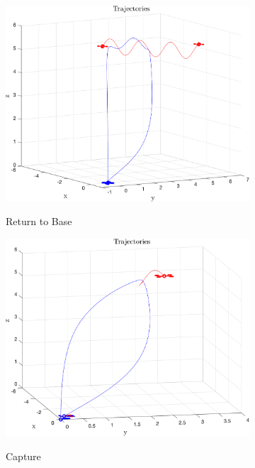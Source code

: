 \documentclass{article}
\begin{document}
\begin{multicols}{2}
\begin{figure}[H]
\begin{subfigure}[b]{0.45\columnwidth}
    \includegraphics[width = 1\textwidth]{images/ReturnToBase.png}
     \label{fig:Return}
     \vspace{-5mm}
      \caption{Return to Base}
 \end{subfigure}
\begin{subfigure}[b]{0.45\columnwidth}
    \centering
    \includegraphics[width = 1\textwidth]{images/Intercept.png}
     \label{fig:Capture}
     \vspace{-5mm}
     \caption{Capture}
 \end{subfigure}
 \begin{subfigure}[b]{0.45\columnwidth}

\end{subfigure}
\end{figure}
\end{multicols}
\end{document}
